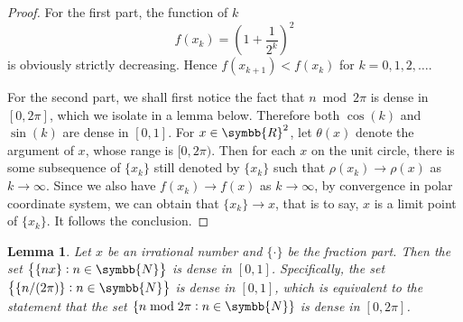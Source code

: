 \documentclass[lineno]{assignment}
\newcommand{\BR}{\symbb{R}}
\theoremstyle{plain}
\newtheorem{lemma}{Lemma}
\begin{document}
    \begin{proof}
        For the first part, the function of $k$
        \begin{equation}
            f(x_k) = \left(1+\frac{1}{2^k}\right)^2
        \end{equation}
        is obviously strictly decreasing. Hence $f(x_{k+1})<f(x_k)$ for $k=0, 1, 2, \dotsc$.

        For the second part, we shall first notice the fact that $n \bmod 2\pi$ is dense in $[0, 2\pi]$, which we isolate in a lemma below. Therefore both $\cos(k)$ and $\sin(k)$ are dense in $[0, 1]$. For $x \in \BR^2$, let $\theta(x)$ denote the argument of $x$, whose range is $[0, 2\pi)$. Then for each $x$ on the unit circle, there is some subsequence of $\{x_k\}$ still denoted by $\{x_k\}$ such that $\rho(x_k)\to\rho(x)$ as $k\to\infty$. Since we also have $f(x_k)\to f(x)$ as $k\to\infty$, by convergence in polar coordinate system, we can obtain that $\{x_k\} \to x$, that is to say, $x$ is a limit point of $\{x_k\}$. It follows the conclusion.
    \end{proof}
    \begin{lemma}
        Let $x$ be an irrational number and $\{\cdot\}$ be the \textit{fraction part}. Then the set $\left\{\{nx\}:n\in\symbb{N}\right\}$ is dense in $[0, 1]$. Specifically, the set $\left\{\{n/(2\pi)\}: n\in\symbb{N}\right\}$ is dense in $[0, 1]$, which is equivalent to the statement that the set $\{n\bmod 2\pi:n\in\symbb{N}\}$ is dense in $[0, 2\pi]$.
    \end{lemma}
\end{document}
